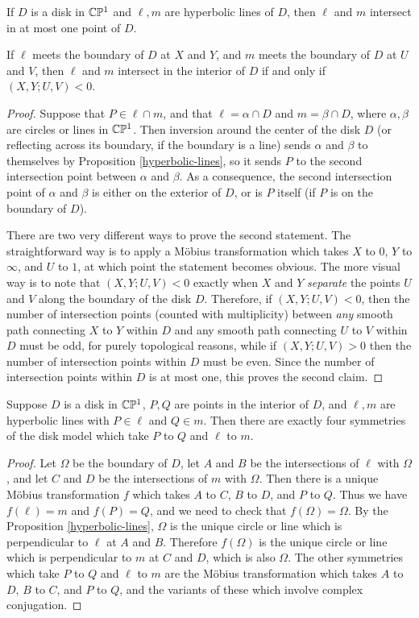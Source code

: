 \begin{prop} If $D$ is a disk in $\mathbb{C}\mathbb{P}^1$ and $\ell, m$ are hyperbolic lines of $D$, then $\ell$ and $m$ intersect in at most one point of $D$.

If $\ell$ meets the boundary of $D$ at $X$ and $Y$, and $m$ meets the boundary of $D$ at $U$ and $V$, then $\ell$ and $m$ intersect in the interior of $D$ if and only if $(X,Y;U,V) < 0$.
\end{prop}
\begin{proof} Suppose that $P \in \ell \cap m$, and that $\ell = \alpha \cap D$ and $m = \beta \cap D$, where $\alpha, \beta$ are circles or lines in $\mathbb{C}\mathbb{P}^1$. Then inversion around the center of the disk $D$ (or reflecting across its boundary, if the boundary is a line) sends $\alpha$ and $\beta$ to themselves by Proposition \ref{hyperbolic-lines}, so it sends $P$ to the second intersection point between $\alpha$ and $\beta$. As a consequence, the second intersection point of $\alpha$ and $\beta$ is either on the exterior of $D$, or is $P$ itself (if $P$ is on the boundary of $D$).

There are two very different ways to prove the second statement. The straightforward way is to apply a M\"obius transformation which takes $X$ to $0$, $Y$ to $\infty$, and $U$ to $1$, at which point the statement becomes obvious. The more visual way is to note that $(X,Y;U,V) < 0$ exactly when $X$ and $Y$ \emph{separate} the points $U$ and $V$ along the boundary of the disk $D$. Therefore, if $(X,Y;U,V) < 0$, then the number of intersection points (counted with multiplicity) between \emph{any} smooth path connecting $X$ to $Y$ within $D$ and any smooth path connecting $U$ to $V$ within $D$ must be odd, for purely topological reasons, while if $(X,Y;U,V) > 0$ then the number of intersection points within $D$ must be even. Since the number of intersection points within $D$ is at most one, this proves the second claim.
\end{proof}

\begin{prop} Suppose $D$ is a disk in $\mathbb{C}\mathbb{P}^1$, $P,Q$ are points in the interior of $D$, and $\ell, m$ are hyperbolic lines with $P \in \ell$ and $Q \in m$. Then there are exactly four symmetries of the disk model which take $P$ to $Q$ and $\ell$ to $m$.
\end{prop}
\begin{proof} Let $\Omega$ be the boundary of $D$, let $A$ and $B$ be the intersections of $\ell$ with $\Omega$, and let $C$ and $D$ be the intersections of $m$ with $\Omega$. Then there is a unique M\"obius transformation $f$ which takes $A$ to $C$, $B$ to $D$, and $P$ to $Q$. Thus we have $f(\ell) = m$ and $f(P) = Q$, and we need to check that $f(\Omega) = \Omega$. By the Proposition \ref{hyperbolic-lines}, $\Omega$ is the unique circle or line which is perpendicular to $\ell$ at $A$ and $B$. Therefore $f(\Omega)$ is the unique circle or line which is perpendicular to $m$ at $C$ and $D$, which is also $\Omega$. The other symmetries which take $P$ to $Q$ and $\ell$ to $m$ are the M\"obius transformation which takes $A$ to $D$, $B$ to $C$, and $P$ to $Q$, and the variants of these which involve complex conjugation.
\end{proof}

